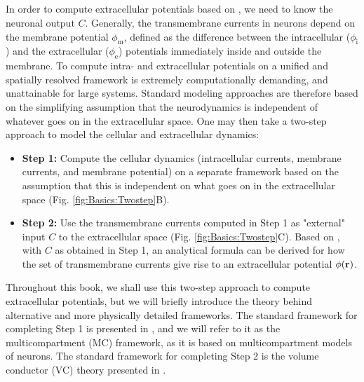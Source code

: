 

\subsection{}
\label{sec:Basics:twostep}
In order to compute extracellular potentials based on , we need to know the neuronal output $C$. Generally, the transmembrane currents in neurons depend on the membrane potential $\phi_\text{m}$, defined as the difference between the intracellular ($\phi_\text{i}$) and the extracellular ($\phi_\text{e}$) potentials immediately inside and outside the membrane. To compute intra- and extracellular potentials on a unified and spatially resolved framework 
is extremely computationally demanding, and unattainable for large systems. Standard modeling approaches are therefore based on the simplifying assumption that the neurodynamics is independent of whatever goes on in the extracellular space. One may then take a two-step approach to model the cellular and extracellular dynamics: 

\begin{itemize}
\item {\bf Step 1:} Compute the cellular dynamics (intracellular currents, membrane currents, and membrane potential) on a separate framework based on the assumption that this is independent on what goes on in the extracellular space (Fig. \ref{fig:Basics:Twostep}B). 

\item {\bf Step 2:} Use the transmembrane currents computed in Step 1 as "external" input $C$ to the extracellular space (Fig. \ref{fig:Basics:Twostep}C). Based on , with $C$ as obtained in Step 1, an analytical formula can be derived for how the set of transmembrane currents give rise to an extracellular potential $\phi({\bf r})$. 
\end{itemize}

Throughout this book, we shall use this two-step approach to compute extracellular potentials, but we will briefly introduce the theory behind alternative and more physically detailed frameworks. The standard framework for completing Step 1 is presented in , and we will refer to it as the multicompartment (MC) framework, as it is based on multicompartment models of neurons. The standard framework for completing Step 2 is the volume conductor (VC) theory presented in  . 



